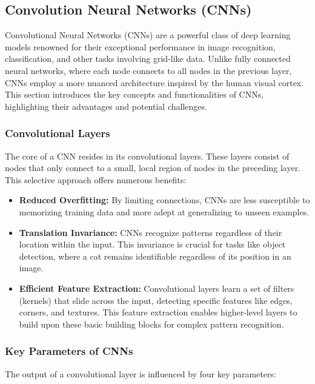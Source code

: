 \subsection{Convolution Neural Networks (CNNs) \cite{manilow2020}}

Convolutional Neural Networks (CNNs) are a powerful class of deep learning models renowned for their exceptional performance in image recognition, classification, and other tasks involving grid-like data. Unlike fully connected neural networks, where each node connects to all nodes in the previous layer, CNNs employ a more nuanced architecture inspired by the human visual cortex. This section introduces the key concepts and functionalities of CNNs, highlighting their advantages and potential challenges.

\subsubsection{Convolutional Layers}
The core of a CNN resides in its convolutional layers. These layers consist of nodes that only connect to a small, local region of nodes in the preceding layer. This selective approach offers numerous benefits:

\begin{itemize}
    \item \textbf{Reduced Overfitting:} By limiting connections, CNNs are less susceptible to memorizing training data and more adept at generalizing to unseen examples.
    \item \textbf{Translation Invariance:} CNNs recognize patterns regardless of their location within the input. This invariance is crucial for tasks like object detection, where a cat remains identifiable regardless of its position in an image.
    \item \textbf{Efficient Feature Extraction:} Convolutional layers learn a set of filters (kernels) that slide across the input, detecting specific features like edges, corners, and textures. This feature extraction enables higher-level layers to build upon these basic building blocks for complex pattern recognition.
\end{itemize}

\subsubsection{Key Parameters of CNNs}
The output of a convolutional layer is influenced by four key parameters:

